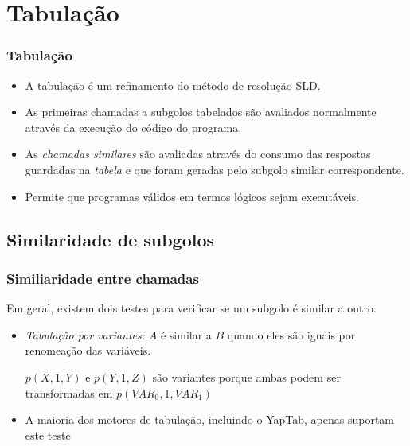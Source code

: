 \documentclass{beamer}
\begin{document}
\section{Tabulação}

\begin{frame}
    \frametitle{Tabulação}
    \begin{itemize}
       \item <+-> A tabulação é um refinamento do método de resolução SLD.
       \item <+-> As primeiras chamadas a subgolos tabelados são avaliados normalmente através da execução do código do
       programa.
       \item <+-> As \emph{chamadas similares} são avaliadas através do consumo das respostas guardadas na \emph{tabela}
       e que foram geradas pelo subgolo similar correspondente.
       \item <+-> Permite que programas válidos em termos lógicos sejam executáveis.
    \end{itemize}
\end{frame}

\subsection{Similaridade de subgolos}

\begin{frame}
   \frametitle{Similiaridade entre chamadas}
   Em geral, existem dois testes para verificar se um subgolo é similar a outro:
   \begin{itemize}
      \item \emph{Tabulação por variantes:} $A$ é similar a $B$ quando eles são iguais por renomeação das variáveis.
      \pause
      \begin{example}
         $p(X,1,Y)$ e $p(Y,1,Z)$ são variantes porque ambas podem ser transformadas em $p(VAR_0,1,VAR_1)$
      \end{example}
      \pause
      \item A maioria dos motores de tabulação, incluindo o YapTab, apenas suportam este teste
   \end{itemize}
\end{frame}
\end{document}
